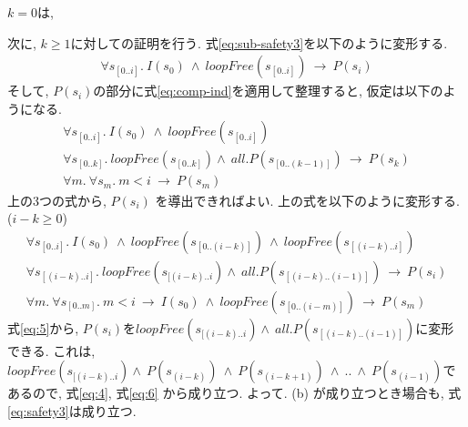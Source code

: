 \documentclass{jsarticle}
\begin{document}
$k = 0$は, 

次に, $k \geq 1$に対しての証明を行う.
式\eqref{eq:sub-safety3}を以下のように変形する.
\begin{align}
 \label{eq:sub-safety4}
  \forall s_{[0..i]}. \ I(s_0) \ \wedge \ \mathit{loopFree}(s_{[0..i]}) \ \to \ P(s_i)
\end{align}
そして, $P(s_i)$の部分に式\eqref{eq:comp-ind}を適用して整理すると, 仮定は以下のようになる.
\begin{align}
  \forall s_{[0..i]}. \ I(s_0) \ \wedge \ \mathit{loopFree}(s_{[0..i]}) \label{eq:1}\\
  \forall s_{[0..k]}. \ \mathit{loopFree}(s_{[0..k]}) \land \ \mathit{all.} P(s_{[0..(k-1)]}) \ \to \ P(s_k) \label{eq:2} \\
  \forall m. \ \forall s_m. \ m < i \ \to \ P(s_m) \label{eq:3}
\end{align}
上の3つの式から, $P(s_i)$ を導出できればよい.
上の式を以下のように変形する. ($i - k \geq 0$) 
\begin{align}
  \forall s_{[0..i]}. \ I(s_0) \ \land \ \mathit{loopFree}(s_{[0..(i-k)]}) \ \land \ \mathit{loopFree}(s_{[(i-k)..i]}) \label{eq:4}\\
  \forall s_{[(i-k)..i]}. \ \mathit{loopFree}(s_{[(i-k)..i}) \land \ \mathit{all.} P(s_{[(i-k)..(i-1)]}) \ \to \ P(s_i) \label{eq:5} \\
  \forall m. \ \forall s_{[0..m]}. \ m < i \ \to \ I(s_0) \ \land \ \mathit{loopFree}(s_{[0..(i-m)]}) \ \to \ P(s_m) \label{eq:6}
\end{align}
式\eqref{eq:5}から, $P(s_i)$を$\mathit{loopFree}(s_{[(i-k)..i}) \land \ \mathit{all.} P(s_{[(i-k)..(i-1)]})$に変形できる.
これは, $\mathit{loopFree}(s_{[(i-k)..i}) \land \ P(s_{(i-k)}) \ \land \ P(s_{(i-k+1)}) \ \land \ .. \ \land \ P(s_{(i-1)})$であるので, 式\eqref{eq:4}, 式\eqref{eq:6} から成り立つ.
よって. (b) が成り立つとき場合も, 式\eqref{eq:safety3}は成り立つ.
\end{document}
